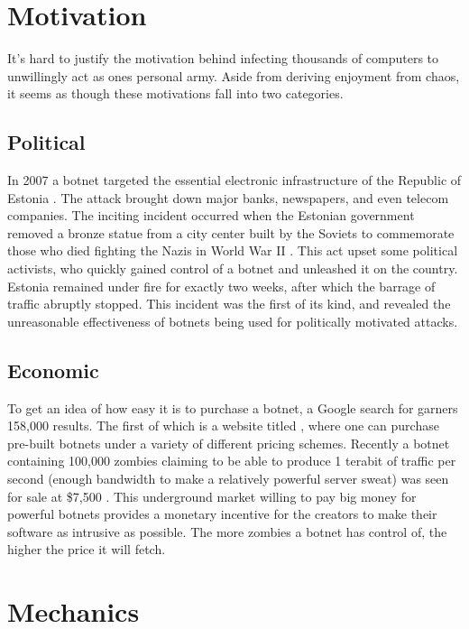 \section{Motivation}
It's hard to justify the motivation behind infecting thousands of computers to
unwillingly act as ones personal army. Aside from deriving enjoyment from chaos,
it seems as though these motivations fall into two categories.

\subsection{Political}
In 2007 a botnet targeted the essential electronic infrastructure of the Republic
of Estonia \cite{estonia}. The attack brought down major banks, newspapers, and
even telecom companies. The inciting incident occurred when the Estonian government
removed a bronze statue from a city center built by the Soviets to commemorate those who died fighting
the Nazis in World War II \cite{estonia}. This act upset some political activists, who quickly
gained control of a botnet and unleashed it on the country.  Estonia remained under
fire for exactly two weeks, after which the barrage of traffic abruptly stopped.
This incident was the first of its kind, and revealed the unreasonable effectiveness
of botnets being used for politically motivated attacks.

\subsection{Economic}
To get an idea of how easy it is to purchase a botnet, a Google search for  garners 158,000 results.
The first of which is a website titled ,
where one can purchase pre-built botnets under a variety of different pricing schemes.
Recently a botnet containing 100,000 zombies claiming to be able to produce
1 terabit of traffic per second (enough bandwidth to make a relatively powerful server sweat)
was seen for sale at \$7,500 \cite{forbessale}. This underground market willing
to pay big money for powerful botnets provides a monetary incentive for the creators to make
their software as intrusive as possible.  The more zombies a botnet has control
of, the higher the price it will fetch.

\section{Mechanics}

